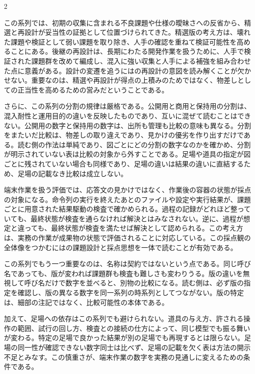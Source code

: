 \documentclass[lualatex,a4paper,10pt]{jlreq}
\begin{document}
\begin{multicols}{2}
\begin{technicalnote}
この系列では、初期の収集に含まれる不良課題や仕様の曖昧さへの反省から、精選と再設計が妥当性の証拠として位置づけられてきた。精選版の考え方は、壊れた課題や検証として弱い課題を取り除き、人手の確認を重ねて検証可能性を高めることにある。後継の再設計は、長期にわたる開発作業を扱うために、人手で検証された課題群を改めて編成し、混入に強い収集と人手による補強を組み合わせた点に意義がある。設計の変遷を追うには\autocite{swepro}の再設計の意図を読み解くことが欠かせない。重要なのは、精選や再設計が得点の上積みのためではなく、物差しとしての正当性を高めるための営みだということである。

さらに、この系列の分割の規律は厳格である。公開用と商用と保持用の分割は、混入耐性と運用目的の違いを反映したものであり、互いに混ぜて読むことはできない。公開用の数字と保持用の数字は、出所も管理も比較の意味も異なる。分割をまたいだ比較は、物差しの取り違えであり、見かけの優劣を作り出すだけである。読む側の作法は単純であり、図ごとにどの分割の数字なのかを確かめ、分割が明示されていない表は比較の対象から外すことである。足場や道具の指定が図ごとに残されていない場合も同様であり、足場の違いは結果の違いに直結するため、足場の記載なき比較は成立しない。
\end{technicalnote}

\begin{technicalnote}
端末作業を扱う評価では、応答文の見かけではなく、作業後の容器の状態が採点の対象になる。命令列の実行を終えたあとのファイルや設定や実行結果が、課題ごとに用意された結果駆動の検査で確かめられる。過程の記録がどれほど整っていても、最終状態が検査を通らなければ解決とはみなされない。逆に、過程が想定と違っても、最終状態が検査を満たせば解決として認められる。この考え方は、実務の作業が成果物の状態で評価されることに対応している。この採点観の全体像をつかむには\autocite{tbench}の課題設計と採点思想を一体で読むことが有効である。

この系列でもう一つ重要なのは、名称は契約ではないという点である。同じ呼び名であっても、版が変われば課題群も検査も難しさも変わりうる。版の違いを無視して呼び名だけで数字を並べると、別物の比較になる。読む側は、必ず版の指定を確認し、版の異なる数字を同一系列の時系列としてつながない。版の特定は、細部の注記ではなく、比較可能性の本体である。

加えて、足場への依存はこの系列でも避けられない。道具の与え方、許される操作の範囲、試行の回し方、検査との接続の仕方によって、同じ模型でも振る舞いが変わる。特定の足場で良かった結果が別の足場でも再現するとは限らない。足場の同一性が確認できない数字同士は比べず、足場の記載を欠く表は方法の開示不足とみなす。この慎重さが、端末作業の数字を実務の見通しに変えるための条件である。
\end{technicalnote}


\end{multicols}
\end{document}

